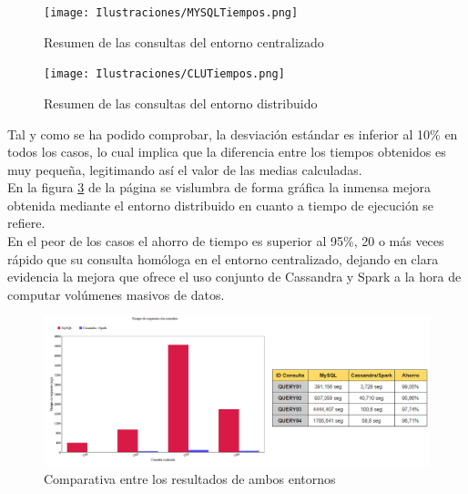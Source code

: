  \begin{figure}[h]
 	\centering
 	\texttt{[image: Ilustraciones/MYSQLTiempos.png]}
 	\caption{Resumen de las consultas del entorno centralizado}
 	\label{fig:consulta_resumen_mysql}
 \end{figure}
 
 \begin{figure}[h]
 	\centering
 	\texttt{[image: Ilustraciones/CLUTiempos.png]}
 	\caption{Resumen de las consultas del entorno distribuido}
 	\label{fig:consulta_resumen_cluster}
 \end{figure}
 
 \clearpage
 
 Tal y como se ha podido comprobar, la desviación estándar es inferior al 10\% en todos los casos, lo cual implica que la diferencia entre los tiempos obtenidos es muy pequeña, legitimando así  el valor de las medias calculadas.\\
 
 En la figura \ref{fig:consulta_resumen_general} de la página \pageref{fig:consulta_resumen_general} se vislumbra de forma gráfica la inmensa mejora obtenida mediante el entorno distribuido en cuanto a tiempo de ejecución se refiere.\\
 
 En el peor de los casos el ahorro de tiempo es superior al 95\%, 20 o más veces rápido que su consulta homóloga en el entorno centralizado, dejando en clara evidencia la mejora que ofrece el uso conjunto de Cassandra y Spark a la hora de computar volúmenes masivos de datos.\\
 
 \begin{figure}[h]
 	\centering
 	\includegraphics[width=1\textwidth]{Ilustraciones/TiempoRespuestaConsultas.png}
 	\caption{Comparativa entre los resultados de ambos entornos}
 	\label{fig:consulta_resumen_general}
 \end{figure}
 
 
 
 


